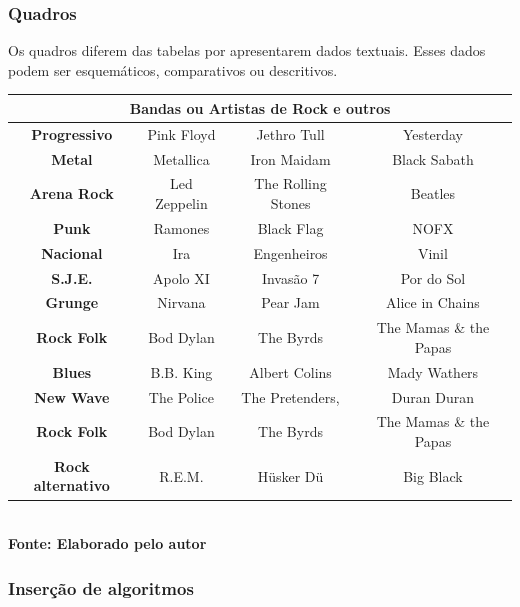 \subsubsection{\esp Quadros}

Os quadros diferem das tabelas por apresentarem dados textuais.
Esses dados podem ser esquemáticos, comparativos ou descritivos.
  	
   	\begin{quadro}[H]
   		\centering
   		\caption{Bandas/Artistas de Rock e outros}
   	\label{qua:quadro1}
	\begin{tabular}{|c|c|c|c|} \hline
	\multicolumn{4}{|c|}{\textbf{Bandas ou Artistas de Rock e outros}} 	  \\ 
		\hline \textbf{	Progressivo} & Pink Floyd & Jethro Tull	& Yesterday \\ 
		 \hline \textbf{ Metal}  & Metallica & Iron Maidam & Black Sabath \\ 
		\hline \textbf{	Arena Rock} & Led Zeppelin & The Rolling Stones & Beatles \\ 
		\hline \textbf{ Punk} & Ramones & Black Flag & NOFX	\\ 
		\hline \textbf{	Nacional} & Ira & Engenheiros & Vinil	\\ 
		\hline \textbf{	S.J.E.} & Apolo XI & Invasão 7 & Por do Sol \\ 
		\hline \textbf{	Grunge} & Nirvana & Pear Jam & Alice in Chains	\\ 
		\hline \textbf{	Rock Folk} & Bod Dylan & The Byrds &  The Mamas \& the Papas \\
		\hline \textbf{	Blues} & B.B. King & Albert Colins & Mady Wathers \\ 
		\hline \textbf{	New Wave} & The Police & The Pretenders, &  Duran Duran\\ 
 		\hline \textbf{	Rock Folk} & Bod Dylan & The Byrds &  The Mamas \& the Papas \\
 		\hline \textbf{	Rock alternativo} & R.E.M.& Hüsker Dü & Big Black\\ 
		\hline
	\end{tabular}
	\vspace{.1cm}  %
	\small
	{\footnotesize\\ \textbf{Fonte: Elaborado pelo autor}}
   \end{quadro}

   
\subsubsection{\esp Inserção de algoritmos}

